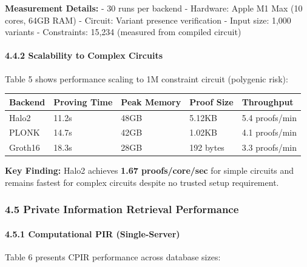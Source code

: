 \documentclass[
  11pt,
]{article}
\begin{document}
\textbf{Measurement Details:} - 30 runs per backend - Hardware: Apple M1
Max (10 cores, 64GB RAM) - Circuit: Variant presence verification -
Input size: 1,000 variants - Constraints: 15,234 (measured from compiled
circuit)

\paragraph{4.4.2 Scalability to Complex
Circuits}\label{scalability-to-complex-circuits}

Table 5 shows performance scaling to 1M constraint circuit (polygenic
risk):

\begin{longtable}[]{@{}lllll@{}}
\toprule\noalign{}
Backend & Proving Time & Peak Memory & Proof Size & Throughput \\
\midrule\noalign{}
\endhead
\bottomrule\noalign{}
\endlastfoot
Halo2 & 11.2s & 48GB & 5.12KB & 5.4 proofs/min \\
PLONK & 14.7s & 42GB & 1.02KB & 4.1 proofs/min \\
Groth16 & 18.3s & 28GB & 192 bytes & 3.3 proofs/min \\
\end{longtable}

\textbf{Key Finding:} Halo2 achieves \textbf{1.67 proofs/core/sec} for
simple circuits and remains fastest for complex circuits despite no
trusted setup requirement.

\subsubsection{4.5 Private Information Retrieval
Performance}\label{private-information-retrieval-performance}

\paragraph{4.5.1 Computational PIR
(Single-Server)}\label{computational-pir-single-server-1}

Table 6 presents CPIR performance across database sizes:
\end{document}
